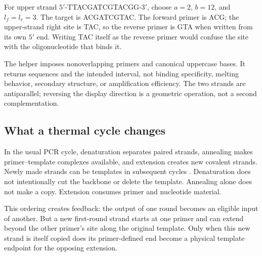 For upper strand $5'$-TTACGATCGTACGG-$3'$, choose $a=2$, $b=12$, and $l_f=l_r=3$. The target is ACGATCGTAC. The forward primer is ACG; the upper-strand right site is TAC, so the reverse primer is GTA when written from its own $5'$ end. Writing TAC itself as the reverse primer would confuse the site with the oligonucleotide that binds it.


The helper imposes nonoverlapping primers and canonical uppercase bases. It returns sequences and the intended interval, not binding specificity, melting behavior, secondary structure, or amplification efficiency. The two strands are antiparallel; reversing the display direction is a geometric operation, not a second complementation.

\subsection{What a thermal cycle changes}
In the usual PCR cycle, denaturation separates paired strands, annealing makes primer--template complexes available, and extension creates new covalent strands. Newly made strands can be templates in subsequent cycles \cite{NEBPCR}. Denaturation does not intentionally cut the backbone or delete the template. Annealing alone does not make a copy. Extension consumes primer and nucleotide material.

This ordering creates feedback: the output of one round becomes an eligible input of another. But a new first-round strand starts at one primer and can extend beyond the other primer's site along the original template. Only when this new strand is itself copied does its primer-defined end become a physical template endpoint for the opposing extension.



